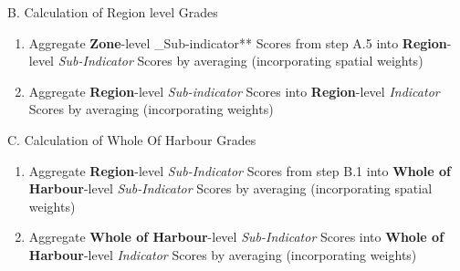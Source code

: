 \documentclass[
  8pt,
  a4paper]{article}
\begin{document}
B. Calculation of Region level Grades

\begin{enumerate}
\def\labelenumi{\arabic{enumi}.}
\item
  Aggregate \textbf{Zone}-level \_Sub-indicator** Scores from step A.5
  into \textbf{Region}-level \emph{Sub-Indicator} Scores by averaging
  (incorporating spatial weights)
\item
  Aggregate \textbf{Region}-level \emph{Sub-indicator} Scores into
  \textbf{Region}-level \emph{Indicator} Scores by averaging
  (incorporating weights)
\end{enumerate}

C. Calculation of Whole Of Harbour Grades

\begin{enumerate}
\def\labelenumi{\arabic{enumi}.}
\item
  Aggregate \textbf{Region}-level \emph{Sub-Indicator} Scores from step
  B.1 into \textbf{Whole of Harbour}-level \emph{Sub-Indicator} Scores
  by averaging (incorporating spatial weights)
\item
  Aggregate \textbf{Whole of Harbour}-level \emph{Sub-Indicator} Scores
  into \textbf{Whole of Harbour}-level \emph{Indicator} Scores by
  averaging (incorporating weights)
\end{enumerate}
\end{document}
